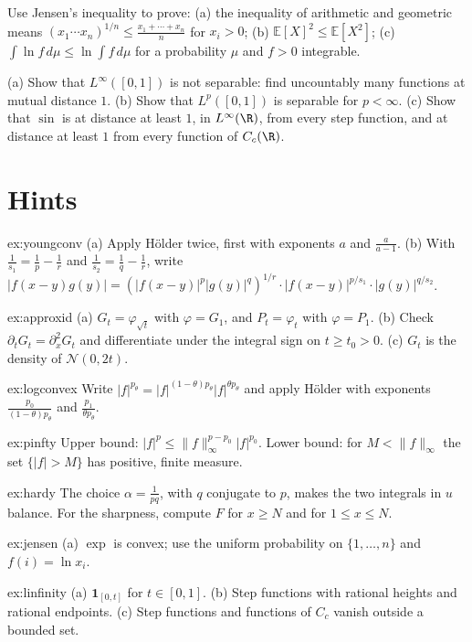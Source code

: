 \begin{exercise}[$\star$]\label{ex:jensen}
Use Jensen's inequality to prove: (a) the inequality of arithmetic and geometric means $(x_1\cdots x_n)^{1/n}\le\frac{x_1+\cdots+x_n}n$ for $x_i>0$; (b) $\mathbb E[X]^2\le\mathbb E[X^2]$; (c) $\int\ln f\,d\mu\le\ln\int f\,d\mu$ for
a probability $\mu$ and $f>0$ integrable.
\end{exercise}

\begin{exercise}[$\star\star$]\label{ex:linfinity}
(a) Show that $L^\infty([0,1])$ is not separable: find uncountably many functions at mutual distance $1$. (b) Show that $L^p([0,1])$ is separable for $p<\infty$. (c) Show that $\sin$ is at distance at
least $1$, in $L^\infty(\R)$, from every step function, and at distance at least $1$ from every function of $C_c(\R)$.
\end{exercise}

\section{Hints}

\begin{hint}{ex:youngconv}
(a) Apply H\"older twice, first with exponents $a$ and $\frac a{a-1}$. (b) With $\frac1{s_1}=\frac1p-\frac1r$ and $\frac1{s_2}=\frac1q-\frac1r$, write $|f(x-y)g(y)|=(|f(x-y)|^p|g(y)|^q)^{1/r}\cdot|f(x-y)|^{p/s_1}\cdot|g(y)|^{q/s_2}$.
\end{hint}
\begin{hint}{ex:approxid}
(a) $G_t=\varphi_{\sqrt t}$ with $\varphi=G_1$, and $P_t=\varphi_t$ with $\varphi=P_1$. (b) Check $\partial_tG_t=\partial_x^2G_t$ and differentiate under the integral sign on $t\ge t_0>0$. (c) $G_t$ is the density of
$\mathcal N(0,2t)$.
\end{hint}
\begin{hint}{ex:logconvex}
Write $|f|^{p_\theta}=|f|^{(1-\theta)p_\theta}|f|^{\theta p_\theta}$ and apply H\"older with exponents $\frac{p_0}{(1-\theta)p_\theta}$ and $\frac{p_1}{\theta p_\theta}$.
\end{hint}
\begin{hint}{ex:pinfty}
Upper bound: $|f|^p\le\|f\|_\infty^{p-p_0}|f|^{p_0}$. Lower bound: for $M<\|f\|_\infty$ the set $\{|f|>M\}$ has positive, finite measure.
\end{hint}
\begin{hint}{ex:hardy}
The choice $\alpha=\frac1{pq}$, with $q$ conjugate to $p$, makes the two integrals in $u$ balance. For the sharpness, compute $F$ for $x\ge N$ and for $1\le x\le N$.
\end{hint}
\begin{hint}{ex:jensen}
(a) $\exp$ is convex; use the uniform probability on $\{1,\dots,n\}$ and $f(i)=\ln x_i$.
\end{hint}
\begin{hint}{ex:linfinity}
(a) $\mathbf 1_{[0,t]}$ for $t\in[0,1]$. (b) Step functions with rational heights and rational endpoints. (c) Step functions and functions of $C_c$ vanish outside a bounded set.
\end{hint}

